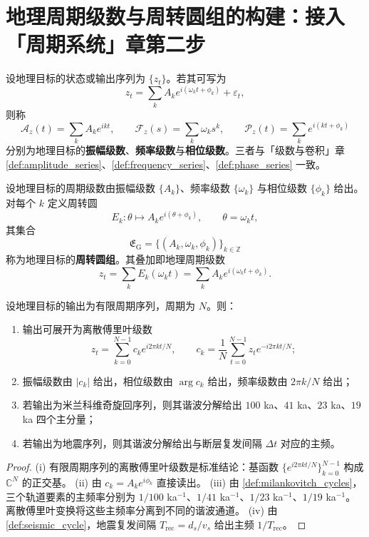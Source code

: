 \section{地理周期级数与周转圆组的构建：接入「周期系统」章第二步}
\label{sec:geo_series_construction}

\begin{definition}\label{def:geo_series}
设地理目标的状态或输出序列为 $\{z_t\}$。若其可写为
\[
z_t=\sum_k A_k e^{i(\omega_k t+\phi_k)}+\varepsilon_t,
\]
则称
\[
\mathcal A_z(t)=\sum_k A_k e^{ikt},\qquad
\mathcal F_z(s)=\sum_k \omega_k s^k,\qquad
\mathcal P_z(t)=\sum_k e^{i(kt+\phi_k)}
\]
分别为地理目标的\textbf{振幅级数}、\textbf{频率级数}与\textbf{相位级数}。三者与「级数与卷积」章 \cref{def:amplitude_series}、\cref{def:frequency_series}、\cref{def:phase_series} 一致。
\end{definition}

\begin{definition}[地理周转圆组]\label{def:geo_epicycle_group}
设地理目标的周期级数由振幅级数 $\{A_k\}$、频率级数 $\{\omega_k\}$ 与相位级数 $\{\phi_k\}$ 给出。对每个 $k$ 定义周转圆
\[
E_k:\theta\mapsto A_k e^{i(\theta+\phi_k)},\qquad \theta=\omega_k t,
\]
其集合
\[
\mathfrak E_{\mathrm{G}}=\{(A_k,\omega_k,\phi_k)\}_{k\in\mathbb Z}
\]
称为地理目标的\textbf{周转圆组}。其叠加即地理周期级数
\[
z_t=\sum_k E_k(\omega_k t)=\sum_k A_k e^{i(\omega_k t+\phi_k)}.
\]
\end{definition}

\begin{theorem}[由地理数据构建周期级数]\label{thm:geo_series_reconstruction}
设地理目标的输出为有限周期序列，周期为 $N$。则：
\begin{enumerate}[label=(\roman*)]
    \item 输出可展开为离散傅里叶级数
    \[
    z_t=\sum_{k=0}^{N-1}c_k e^{i2\pi kt/N},\qquad
    c_k=\frac1N\sum_{t=0}^{N-1}z_t e^{-i2\pi kt/N};
    \]
    \item 振幅级数由 $|c_k|$ 给出，相位级数由 $\arg c_k$ 给出，频率级数由 $2\pi k/N$ 给出；
    \item 若输出为米兰科维奇旋回序列，则其谐波分解给出 $100$ ka、$41$ ka、$23$ ka、$19$ ka 四个主分量；
    \item 若输出为地震序列，则其谐波分解给出与断层复发间隔 $\Delta t$ 对应的主频。
\end{enumerate}
\end{theorem}

\begin{proof}
(i) 有限周期序列的离散傅里叶级数是标准结论：基函数 $\{e^{i2\pi kt/N}\}_{k=0}^{N-1}$ 构成 $\mathbb C^N$ 的正交基。
(ii) 由 $c_k=A_k e^{i\phi_k}$ 直接读出。
(iii) 由 \cref{def:milankovitch_cycles}，三个轨道要素的主频率分别为 $1/100$ ka$^{-1}$、$1/41$ ka$^{-1}$、$1/23$ ka$^{-1}$、$1/19$ ka$^{-1}$。离散傅里叶变换将这些主频率分离到不同的谐波通道。
(iv) 由 \cref{def:seismic_cycle}，地震复发间隔 $T_{\text{rec}}=d_s/v_s$ 给出主频 $1/T_{\text{rec}}$。
\end{proof}

